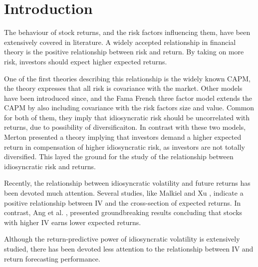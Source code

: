 \chapter{Introduction}
The behaviour of stock returns, and the risk factors influencing them, have been extensively covered in literature. A widely accepted relationship in financial theory is the positive relationship between risk and return. By taking on more risk, investors should expect higher expected returns.

One of the first theories describing this relationship is the widely known CAPM, the theory expresses that all risk is covariance with the market. Other models have been introduced since, and the Fama French three factor model \cite{famafrench} extends the CAPM by also including covariance with the risk factors size and value. Common for both of them, they imply that idiosyncratic risk should be uncorrelated with returns, due to possibility of diversificaiton. In contrast with these two models, Merton \cite{merton87} presented a theory implying that investors demand a higher expected return in compensation of higher idiosyncratic risk, as investors are not totally diversified. This layed the ground for the study of the relationship between idiosyncratic risk and returns.

Recently, the relationship between idiosyncratic volatility and future returns has been devoted much attention. Several studies, like Malkiel and Xu \cite{malkielxu02}, indicate a positive relationship between IV and the cross-section of expected returns. In contrast, Ang et al. \cite{angetal06}, presented groundbreaking results concluding that stocks with higher IV earns lower expected returns.

Although the return-predictive power of idiosyncratic volatility is extensively studied, there has been devoted less attention to the relationship between IV and return forecasting performance. 

